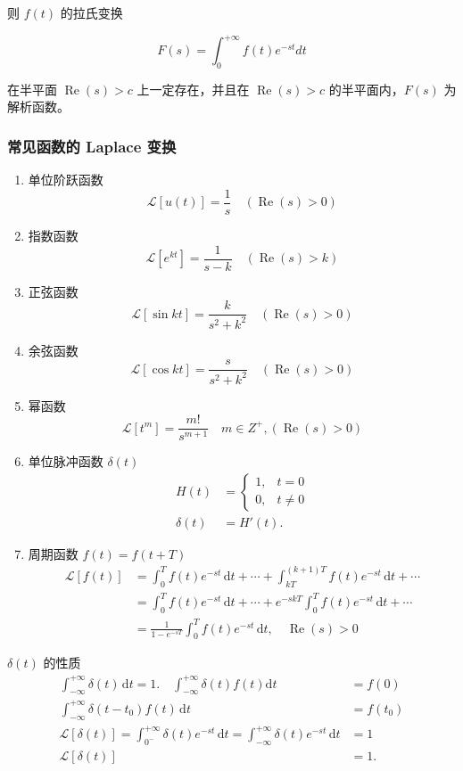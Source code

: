 则 \(f(t)\) 的拉氏变换

\[
F(s)=\int_{0}^{+\infty}f(t)e^{-st}dt
\]

在半平面 \(\operatorname{Re}(s)>c\) 上一定存在，并且在
\(\operatorname{Re}(s)>c\) 的半平面内，\(F(s)\) 为解析函数。
\subsubsection{常见函数的 Laplace 变换}
\label{常见函数的 laplace 变换}
\begin{enumerate}
\item 单位阶跃函数
\[
    \mathcal{L}[u(t)] = \frac{1}{s} \quad (\operatorname{Re}(s) > 0)
    \]
\item 指数函数
\[
    \mathcal{L}[e^{kt}] = \frac{1}{s - k} \quad (\operatorname{Re}(s) > k)
    \]
\item 正弦函数
\[
    \mathcal{L}[\sin kt] = \frac{k}{s^{2} + k^{2}} \quad (\operatorname{Re}(s) > 0)
    \]
\item 余弦函数
\[
    \mathcal{L}[\cos kt] = \frac{s}{s^{2} + k^{2}} \quad (\operatorname{Re}(s) > 0)
    \]
\item 幂函数
\[
    \mathcal{L}[t^{m}] = \frac{m!}{s^{m+1}} \quad m \in Z^{+}, (\operatorname{Re}(s) > 0)
    \]
\item 单位脉冲函数 \(\delta(t)\)
\begin{align*}
 H(t) &= \begin{cases}
     1, & t=0\\
     0, & t \ne 0
 \end{cases} \\
 \delta(t) &= H'(t).
 \end{align*}
\item 周期函数 \(f(t)=f(t+T)\)
\begin{align*}
    \mathcal{L}[f(t)]
    &= \int _0^T f(t)e^{-st}\,\mathrm{d}t + \cdots + \int _{kT}^{(k+1)T} f(t)e^{-st}\,\mathrm{d}t + \cdots
    \\[1ex]
    &= \int _0^T f(t)e^{-st}\,\mathrm{d}t + \cdots + e^{-skT} \int _0^T f(t)e^{-st}\,\mathrm{d}t + \cdots
    \\[1ex]
    &= \boxed{\frac{1}{1-e^{-sT}} \int _0^T f(t)e^{-st}\,\mathrm{d}t,\quad \operatorname{Re}(s) > 0}
\end{align*}
\end{enumerate}

\begin{tcolorbox}[title={Note},colback=red!5!white
,colframe=red!75!black
,colbacktitle=yellow!50!red
,coltitle=red!25!black, fonttitle=\bfseries,subtitle style={boxrule=0.4pt, colback=yellow!50!red!25!white}]
\(\delta(t)\) 的性质
\begin{align*}
\int_{-\infty}^{+\infty} \delta(t) \,\mathrm{d}t = 1. \quad \int_{-\infty}^{+\infty} \delta(t)f(t) \mathrm{d}t &= f(0) \\
\int_{-\infty}^{+\infty} \delta(t-t_0)f(t) \,\mathrm{d}t &= f(t_0) \\
\mathcal{L}[\delta(t)] = \int_{0^{-}}^{+\infty}\delta(t)e^{-st} \,\mathrm{d}t = \int _{-\infty}^{+\infty} \delta(t)e^{-st} \,\mathrm{d}t &= 1 \\
\mathcal{L}[\delta(t)] &= 1.
\end{align*}

\end{tcolorbox}
